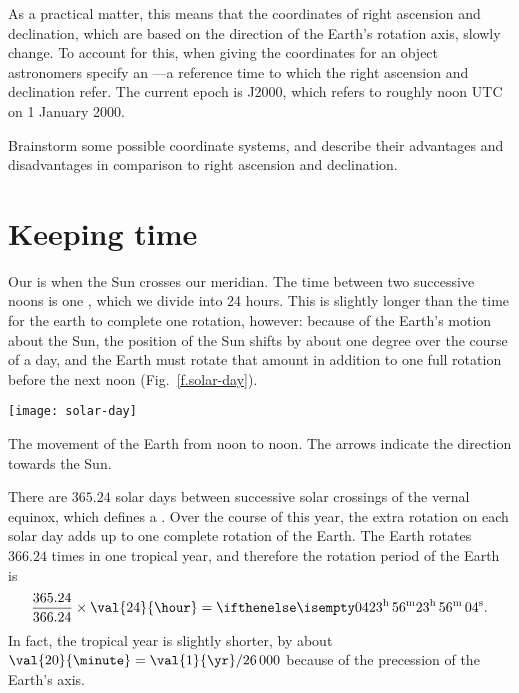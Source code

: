 As a practical matter, this means that the coordinates of right ascension and declination, which are based on the direction of the Earth's rotation axis, slowly change. To account for this, when giving the coordinates for an object astronomers specify an ---a reference time to which the right ascension and declination refer. The current epoch is J2000, which refers to roughly noon UTC on 1 January 2000.

\begin{exercisebox}
Brainstorm some possible coordinate systems, and describe their advantages and disadvantages in comparison to right ascension and declination.
\end{exercisebox}

\section{Keeping time}

Our  is when the Sun crosses our meridian. The time between two successive noons is one , which we divide into 24 hours. This is slightly longer than the time for the earth to complete one rotation, however: because of the Earth's motion about the Sun, the position of the Sun shifts by about one degree over the course of a day, and the Earth must rotate that amount in addition to one full rotation before the next noon (Fig.~\ref{f.solar-day}).

\begin{marginfigure}
\texttt{[image: solar-day]}
\caption[The movement of the Earth from noon to noon]{The movement of the Earth from noon to noon.  The arrows indicate the direction towards the Sun.}
\label{f.solar-day}
\end{marginfigure}

There are $365.24$ solar days between successive solar crossings of the vernal equinox, which defines a .  Over the course of this year, the extra rotation on each solar day adds up to one complete rotation of the Earth.  The Earth rotates $366.24$ times in one tropical year, and therefore the rotation period of the Earth is
\[ \frac{365.24}{366.24}\times \val{24}{\hour} =  \hrangle{23}{56}{04}.  \]
In fact, the tropical year is slightly shorter, by about $\val{20}{\minute} = \val{1}{\yr}/26\,000$ because of the precession of the Earth's axis.


